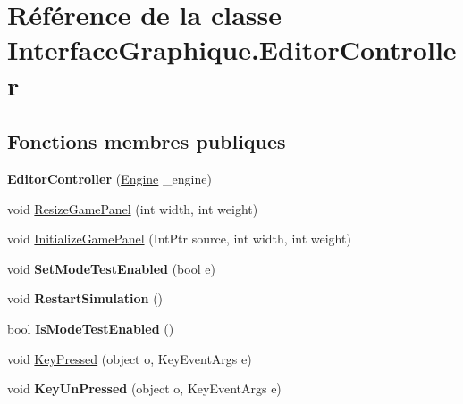 \hypertarget{class_interface_graphique_1_1_editor_controller}{\section{Référence de la classe Interface\-Graphique.\-Editor\-Controller}
\label{class_interface_graphique_1_1_editor_controller}
}
\subsection*{Fonctions membres publiques}
\begin{DoxyCompactItemize}
\item 
\hypertarget{class_interface_graphique_1_1_editor_controller_a3f3e19aed5d0988e2d2000eb23d0e132}{{\bfseries Editor\-Controller} (\hyperlink{class_interface_graphique_1_1_engine}{Engine} \-\_\-engine)}\label{class_interface_graphique_1_1_editor_controller_a3f3e19aed5d0988e2d2000eb23d0e132}

\item 
void \hyperlink{class_interface_graphique_1_1_editor_controller_a052c20d063cfdcdb23b49ae42685af52}{Resize\-Game\-Panel} (int width, int weight)
\item 
void \hyperlink{class_interface_graphique_1_1_editor_controller_a2ac0bac5feff762e5f55d159ed01ac48}{Initialize\-Game\-Panel} (Int\-Ptr source, int width, int weight)
\item 
\hypertarget{class_interface_graphique_1_1_editor_controller_adbb57762650983e2cb06adbe5e131bbb}{void {\bfseries Set\-Mode\-Test\-Enabled} (bool e)}\label{class_interface_graphique_1_1_editor_controller_adbb57762650983e2cb06adbe5e131bbb}

\item 
\hypertarget{class_interface_graphique_1_1_editor_controller_a2721ab50af6b8e065ee606220c36fc40}{void {\bfseries Restart\-Simulation} ()}\label{class_interface_graphique_1_1_editor_controller_a2721ab50af6b8e065ee606220c36fc40}

\item 
\hypertarget{class_interface_graphique_1_1_editor_controller_af8bed2834a27d46d457d8864739d8611}{bool {\bfseries Is\-Mode\-Test\-Enabled} ()}\label{class_interface_graphique_1_1_editor_controller_af8bed2834a27d46d457d8864739d8611}

\item 
void \hyperlink{class_interface_graphique_1_1_editor_controller_ab894ff912a93b72593ea550cf54d91a5}{Key\-Pressed} (object o, Key\-Event\-Args e)
\item 
\hypertarget{class_interface_graphique_1_1_editor_controller_a1ae3734fb4e43fd5221990e95baaa7df}{void {\bfseries Key\-Un\-Pressed} (object o, Key\-Event\-Args e)}\label{class_interface_graphique_1_1_editor_controller_a1ae3734fb4e43fd5221990e95baaa7df}


\end{DoxyCompactItemize}
